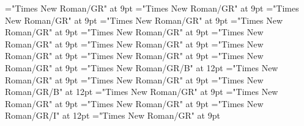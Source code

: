 \documentclass[gps1,twoside]{article}
\begin{document}
\font\visiblecomplexformbackrefvisiblecomplexformbackrefvisiblecomplexformbackrefssensesensessubentrysubentriesentrybefore="Times New Roman/GR" at 9pt
\font\visiblecomplexformbackrefssensesensessubentrysubentriesentryafter="Times New Roman/GR" at 9pt
\font\complexformtypesvisiblecomplexformbackrefvisiblecomplexformbackrefssensesensessubentrysubentriesentryafter="Times New Roman/GR" at 9pt
\font\spanspanreverseabbrcomplexformtypecomplexformtypesvisiblecomplexformbackrefvisiblecomplexformbackrefssensesensessubentrysubentriesentrybefore="Times New Roman/GR" at 9pt
\font\spanspanheadwordvisiblecomplexformbackrefvisiblecomplexformbackrefssensesensessubentrysubentriesentrybefore="Times New Roman/GR" at 9pt
\font\spanspanowningentrysummarydefinitionvisiblecomplexformbackrefvisiblecomplexformbackrefssensesensessubentrysubentriesentrybefore="Times New Roman/GR" at 9pt
\font\spanowningentrysummarydefinitionvisiblecomplexformbackrefvisiblecomplexformbackrefssensesensessubentrysubentriesentryfirstchildbefore="Times New Roman/GR" at 9pt
\font\spanowningentrysummarydefinitionvisiblecomplexformbackrefvisiblecomplexformbackrefssensesensessubentrysubentriesentrylastchildafter="Times New Roman/GR" at 9pt
\font\nontrivialentryrootnontrivialentryrootnontrivialentryrootsvisiblecomplexformbackrefvisiblecomplexformbackrefssensesensessubentrysubentriesentrybefore="Times New Roman/GR" at 9pt
\font\nontrivialentryrootsvisiblecomplexformbackrefvisiblecomplexformbackrefssensesensessubentrysubentriesentrybefore="Times New Roman/GR" at 9pt
\font\nontrivialentryrootsvisiblecomplexformbackrefvisiblecomplexformbackrefssensesensessubentrysubentriesentryafter="Times New Roman/GR" at 9pt
\font\nontrivialentryrootnontrivialentryrootsvisiblecomplexformbackrefvisiblecomplexformbackrefssensesensessubentrysubentriesentry="Times New Roman/GR/B" at 12pt
\font\spanspansensecontentspansensessensesensessubentrysubentriesentrybefore="Times New Roman/GR" at 9pt
\font\sensessensesensessubentrysubentriesentryafter="Times New Roman/GR" at 9pt
\font\sensenumbersensecontentsensessensesensessubentrysubentriesentry="Times New Roman/GR/B" at 12pt
\font\sensenumbersensecontentsensessensesensessubentrysubentriesentryafter="Times New Roman/GR" at 9pt
\font\sensetypesensesensessensesensessubentrysubentriesentrybefore="Times New Roman/GR" at 9pt
\font\sensetypesensesensessensesensessubentrysubentriesentryafter="Times New Roman/GR" at 9pt
\font\sensetypesensesensessensesensessubentrysubentriesentry="Times New Roman/GR/I" at 12pt
\font\spanspanabbreviationsensetypesensesensessensesensessubentrysubentriesentrybefore="Times New Roman/GR" at 9pt
\end{document}
